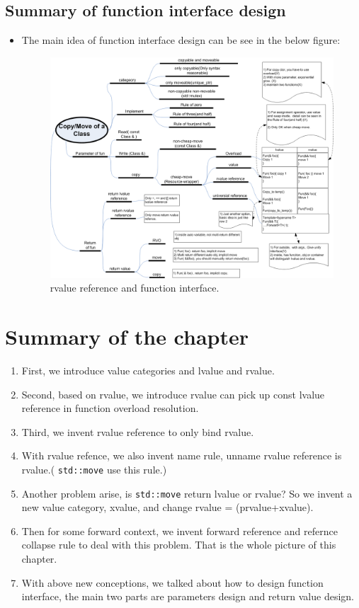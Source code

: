 \documentclass[a4paper,11pt,twoside]{book}
\begin{document}
\subsection{Summary of function interface design}
\begin{itemize}
		\item The main idea of function interface design can be see in the below figure:
	\begin{figure}[h]
	\centering
	\includegraphics[width=1.0\linewidth]{pics/move.png}
	\caption{rvalue reference and function interface.}
	\label{fig:rvalueref}
	\end{figure}

\end{itemize}

\section{Summary of the chapter}
\begin{enumerate}
		\item First, we introduce value categories and lvalue and rvalue.
		\item Second, based on rvalue, we introduce rvalue can pick up const lvalue reference in function overload resolution. 
		\item Third, we invent rvalue reference to only bind rvalue.
		\item With rvalue refence, we also invent name rule, unname rvalue reference is rvalue.( \texttt{std::move} use this rule.) 
		\item Another problem arise, is \texttt{std::move} return lvalue or rvalue? So we invent a new value category, xvalue, and change rvalue = (prvalue+xvalue).

		\item Then for some forward context, we invent forward reference and refernce collapse rule to deal with this problem. That is the whole picture of this chapter.
				
		\item With above new conceptions, we talked about how to design function interface, the main two parts are parameters design and return value design. 
\end{enumerate}
\end{document}

